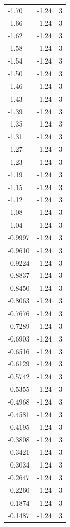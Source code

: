 \begin{longtable}{lrr}
  -1.70 & -1.24 & 3 \\
  -1.66 & -1.24 & 3 \\
  -1.62 & -1.24 & 3 \\
  -1.58 & -1.24 & 3 \\
  -1.54 & -1.24 & 3 \\
  -1.50 & -1.24 & 3 \\
  -1.46 & -1.24 & 3 \\
  -1.43 & -1.24 & 3 \\
  -1.39 & -1.24 & 3 \\
  -1.35 & -1.24 & 3 \\
  -1.31 & -1.24 & 3 \\
  -1.27 & -1.24 & 3 \\
  -1.23 & -1.24 & 3 \\
  -1.19 & -1.24 & 3 \\
  -1.15 & -1.24 & 3 \\
  -1.12 & -1.24 & 3 \\
  -1.08 & -1.24 & 3 \\
  -1.04 & -1.24 & 3 \\
  -0.9997 & -1.24 & 3 \\
  -0.9610 & -1.24 & 3 \\
  -0.9224 & -1.24 & 3 \\
  -0.8837 & -1.24 & 3 \\
  -0.8450 & -1.24 & 3 \\
  -0.8063 & -1.24 & 3 \\
  -0.7676 & -1.24 & 3 \\
  -0.7289 & -1.24 & 3 \\
  -0.6903 & -1.24 & 3 \\
  -0.6516 & -1.24 & 3 \\
  -0.6129 & -1.24 & 3 \\
  -0.5742 & -1.24 & 3 \\
  -0.5355 & -1.24 & 3 \\
  -0.4968 & -1.24 & 3 \\
  -0.4581 & -1.24 & 3 \\
  -0.4195 & -1.24 & 3 \\
  -0.3808 & -1.24 & 3 \\
  -0.3421 & -1.24 & 3 \\
  -0.3034 & -1.24 & 3 \\
  -0.2647 & -1.24 & 3 \\
  -0.2260 & -1.24 & 3 \\
  -0.1874 & -1.24 & 3 \\
  -0.1487 & -1.24 & 3 \\

\end{longtable}
